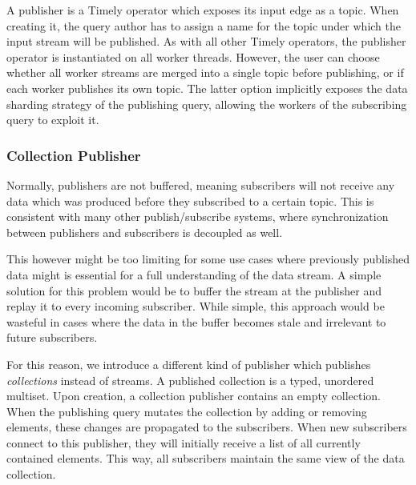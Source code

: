 A publisher is a Timely operator which exposes its input edge as a topic. When
creating it, the query author has to assign a name for the topic under which the
input stream will be published. As with all other Timely operators, the publisher
operator is instantiated on all worker threads. However, the user can choose
whether all worker streams are merged into a single topic before publishing, or
if each worker publishes its own topic. The latter option implicitly exposes
the data sharding strategy of the publishing query, allowing the workers of
the subscribing query to exploit it.


\subsubsection{Collection Publisher}

Normally, publishers are not buffered, meaning subscribers will
not receive any data which was produced before they subscribed to a certain
topic. This is consistent with many other publish/subscribe systems, where
synchronization between publishers and subscribers is decoupled as well. \cite{pubsub}

This however might be too limiting for some use cases where previously published
data might is essential for a full understanding of the data stream. A simple
solution for this problem would be to buffer the stream at the publisher
and replay it to every incoming subscriber. While simple, this approach
would be wasteful in cases where the data in the buffer becomes stale and
irrelevant to future subscribers. 

For this reason, we introduce a different kind of publisher which publishes
\emph{collections} instead of streams. A published collection is a typed, unordered
multiset. Upon creation, a collection publisher contains an empty collection.
When the publishing query mutates the collection by adding or removing elements,
these changes are propagated to the subscribers. When new subscribers connect
to this publisher, they will initially receive a list of all currently contained
elements. This way, all subscribers maintain the same view of the data collection.

